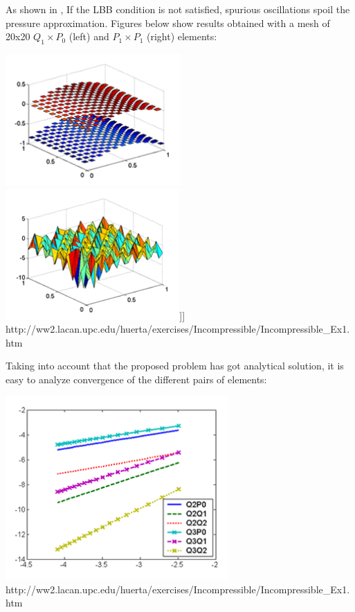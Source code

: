 \vspace{.5cm}


As shown in \cite{dohu03}, If the LBB condition is not satisfied, spurious oscillations spoil the pressure approximation. 
Figures below show results obtained with a mesh of 20x20 $Q_1\times P_0$ (left) and $P_1\times P_1$ (right) elements:
\begin{center}
\includegraphics[height=5cm]{images/mms/Ex1_Q1P0_pres.png}
\includegraphics[height=5cm]{images/mms/Ex1_P1P1_pres.png}]]
{\small http://ww2.lacan.upc.edu/huerta/exercises/Incompressible/Incompressible\_Ex1.htm}
\end{center}

Taking into account that the proposed problem has got analytical solution, it is easy to analyze convergence of the different pairs of elements:
\begin{center}
\includegraphics[height=7cm]{images/mms/Ex1_conv_qua.png}\\
{\small http://ww2.lacan.upc.edu/huerta/exercises/Incompressible/Incompressible\_Ex1.htm}
\end{center}


